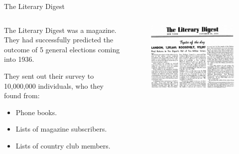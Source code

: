 \documentclass[aspectratio=169]{../latex_main/tntbeamer}  %
\begin{document}
	\begin{frame}{The Literary Digest}
	    \begin{columns}
	        \begin{column}{.4\textwidth}
	            The Literary Digest was a magazine. They had successfully predicted the outcome of 5 general elections coming into 1936.
	            \bigskip
	            
	            They sent out their survey to 10,000,000 individuals, who they found from:
	            \begin{itemize}
	                \item Phone books.
	                \item Lists of magazine subscribers.
	                \item Lists of country club members.
	            \end{itemize}
	        \end{column}
	        
	        \begin{column}{.5\textwidth}
	            \begin{figure}
	                \centering
	                \includegraphics[scale=.58]{Bild12}
	            \end{figure}
	        \end{column}
	        
	    \end{columns}
	    
	\end{frame}
	
\end{document}
